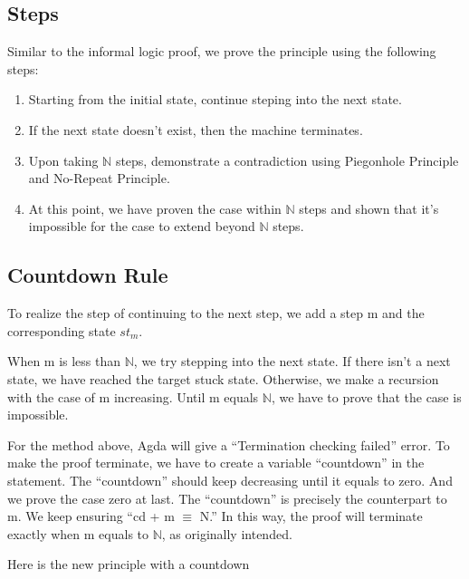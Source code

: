 \subsection{ Steps }



Similar to the informal logic proof, we prove the principle using the following steps:
\begin{enumerate}[1.]
    \item Starting from the initial state, continue steping into the next state.
    \item If the next state doesn't exist, then the machine terminates.
    \item Upon taking $\mathbb{N}$ steps, demonstrate a contradiction using Piegonhole Principle and No-Repeat Principle.
    \item At this point, we have proven the case within $\mathbb{N}$ steps and shown that it's impossible for the case to extend beyond $\mathbb{N}$ steps.
\end{enumerate}

\subsection{ Countdown Rule }
To realize the step of continuing to the next step, we add a step m and the corresponding state $st_{m}$.



When m is less than $\mathbb{N}$, we try stepping into the next state.  
If there isn't a next state, we have reached the target stuck state.  
Otherwise, we make a recursion with the case of m increasing.
Until m equals $\mathbb{N}$, we have to prove that the case is impossible.



For the method above, Agda will give a ``Termination checking failed'' error.
To make the proof terminate, we have to create a variable ``countdown'' in the statement.  
The ``countdown'' should keep decreasing until it equals to zero.  And we prove the case zero at last.
The ``countdown'' is precisely the counterpart to m.  
We keep ensuring ``cd + m $\equiv$ N.''  
In this way, the proof will terminate exactly when m equals to $\mathbb{N}$, as originally intended.

Here is the new principle with a countdown

